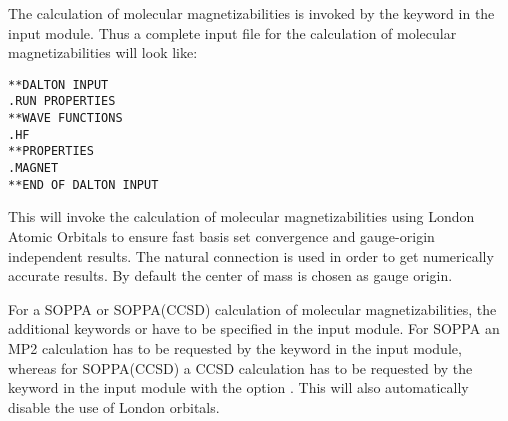 \begin{center}
\end{center}

The calculation of molecular magnetizabilities
is invoked by the
keyword  in the  input module. Thus
a complete input file for the calculation of molecular
magnetizabilities will look like:

\begin{verbatim}
**DALTON INPUT
.RUN PROPERTIES
**WAVE FUNCTIONS
.HF
**PROPERTIES
.MAGNET
**END OF DALTON INPUT
\end{verbatim}

This will invoke the calculation of molecular magnetizabilities using
London Atomic Orbitals to ensure fast basis set
convergence and
gauge-origin independent results.
The natural connection
\cite{joklbkrthpjtca90} is used in order to get numerically accurate
results. By default the center of mass is chosen
as gauge origin.

For a SOPPA or SOPPA(CCSD) calculation of
molecular magnetizabilities, the additional keywords  or
 have to be specified in the  input
module. For SOPPA an MP2 calculation has to be requested by the keyword
 in the  input module, whereas for SOPPA(CCSD) a
CCSD calculation has to be requested by the keyword  in the  input module with the  option
. This will also automatically disable the use of London
orbitals. 

